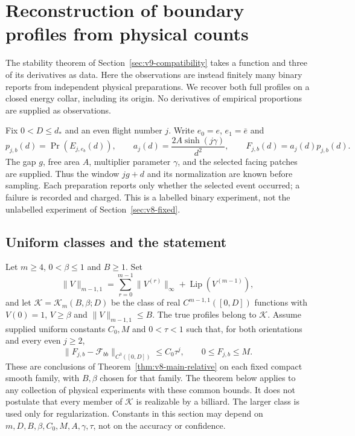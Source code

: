 \section{Reconstruction of boundary profiles from physical counts}
\label{sec:v10-acquisition}
The stability theorem of Section~\ref{sec:v9-compatibility} takes a
function and three of its derivatives as data. Here the observations
are instead finitely many binary reports from independent physical
preparations. We recover both full profiles on a closed energy collar,
including its origin. No derivatives of empirical proportions are
supplied as observations.

Fix $0<D\le d_*$ and an even flight number $j$. Write $e_0=e$,
$e_1=\bar e$ and
\begin{equation}\label{eq:v10-observation}
 p_{j,b}(d)=\Pr(E_{j,e_b}(d)),\qquad
 a_j(d)=\frac{2A\sinh(j\gamma)}{d^2},\qquad
 F_{j,b}(d)=a_j(d)p_{j,b}(d).
\end{equation}
The gap $g$, free area $A$, multiplier parameter $\gamma$, and the
selected facing patches are supplied. Thus the window $jg+d$ and its
normalization are known before sampling. Each preparation reports only
whether the selected event occurred; a failure is recorded and charged.
This is a labelled binary experiment, not the unlabelled experiment
of Section~\ref{sec:v8-fixed}.

\subsection{Uniform classes and the statement}
Let $m\ge4$, $0<\beta\le1$ and $B\ge1$. Set
\[
 \|V\|_{m-1,1}=\sum_{r=0}^{m-1}\|V^{(r)}\|_\infty
                         +\operatorname{Lip}(V^{(m-1)}),
\]
and let $\mathcal K=\mathcal K_m(B,\beta;D)$ be the class of real
$C^{m-1,1}([0,D])$ functions with $V(0)=1$, $V\ge\beta$ and
$\|V\|_{m-1,1}\le B$. The true profiles belong to $\mathcal K$.
Assume supplied uniform constants $C_0,M$ and $0<\tau<1$ such that,
for both orientations and every even $j\ge2$,
\begin{equation}\label{eq:v10-physical-bounds}
 \|F_{j,b}-\mathcal F_{bb}\|_{C^3([0,D])}\le C_0\tau^j,
 \qquad 0\le F_{j,b}\le M.
\end{equation}
These are conclusions of Theorem~\ref{thm:v8-main-relative} on each
fixed compact smooth family, with $B,\beta$ chosen for that family.
The theorem below applies to any collection of physical experiments
with these common bounds. It does not postulate that every member
of $\mathcal K$ is realizable by a billiard. The larger class is used
only for regularization. Constants in this section may depend on
$m,D,B,\beta,C_0,M,A,\gamma,\tau$, not on the accuracy or confidence.

